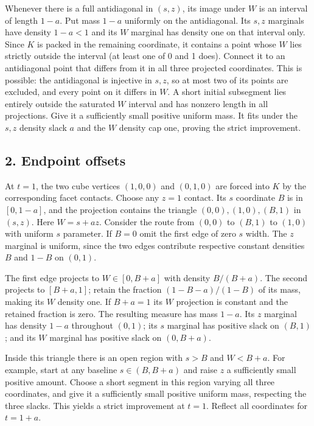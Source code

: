 \documentclass[
  10pt,
]{article}
\begin{document}
Whenever there is a full antidiagonal in \((s,z)\), its image under
\(W\) is an interval of length \(1-a\). Put mass \(1-a\) uniformly on
the antidiagonal. Its \(s,z\) marginals have density \(1-a<1\) and its
\(W\) marginal has density one on that interval only. Since \(K\) is
packed in the remaining coordinate, it contains a point whose \(W\) lies
strictly outside the interval (at least one of 0 and 1 does). Connect it
to an antidiagonal point that differs from it in all three projected
coordinates. This is possible: the antidiagonal is injective in \(s,z\),
so at most two of its points are excluded, and every point on it differs
in \(W\). A short initial subsegment lies entirely outside the saturated
\(W\) interval and has nonzero length in all projections. Give it a
sufficiently small positive uniform mass. It fits under the \(s,z\)
density slack \(a\) and the \(W\) density cap one, proving the strict
improvement.

\subsection{2. Endpoint offsets}\label{endpoint-offsets}

At \(t=1\), the two cube vertices \((1,0,0)\) and \((0,1,0)\) are forced
into \(K\) by the corresponding facet contacts. Choose any \(z=1\)
contact. Its \(s\) coordinate \(B\) is in \([0,1-a]\), and the
projection contains the triangle \((0,0),(1,0),(B,1)\) in \((s,z)\).
Here \(W=s+az\). Consider the route from \((0,0)\) to \((B,1)\) to
\((1,0)\) with uniform \(s\) parameter. If \(B=0\) omit the first edge
of zero \(s\) width. The \(z\) marginal is uniform, since the two edges
contribute respective constant densities \(B\) and \(1-B\) on \((0,1)\).

The first edge projects to \(W\in[0,B+a]\) with density \(B/(B+a)\). The
second projects to \([B+a,1]\); retain the fraction \((1-B-a)/(1-B)\) of
its mass, making its \(W\) density one. If \(B+a=1\) its \(W\)
projection is constant and the retained fraction is zero. The resulting
measure has mass \(1-a\). Its \(z\) marginal has density \(1-a\)
throughout \((0,1)\); its \(s\) marginal has positive slack on
\((B,1)\); and its \(W\) marginal has positive slack on \((0,B+a)\).

Inside this triangle there is an open region with \(s>B\) and \(W<B+a\).
For example, start at any baseline \(s\in(B,B+a)\) and raise \(z\) a
sufficiently small positive amount. Choose a short segment in this
region varying all three coordinates, and give it a sufficiently small
positive uniform mass, respecting the three slacks. This yields a strict
improvement at \(t=1\). Reflect all coordinates for \(t=1+a\).
\end{document}
